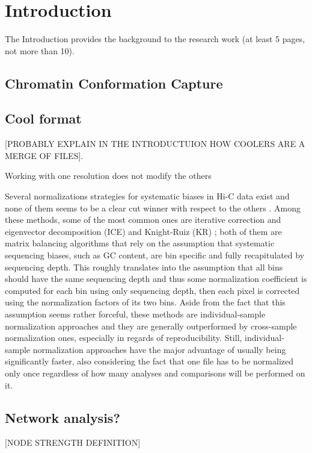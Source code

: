 \graphicspath{{chapters/02_introduction/}}
\chapter{Introduction}

The Introduction provides the background to the research work (at least 5 pages, not more
than 10).

\section{Chromatin Conformation Capture}

\section{Cool format}

[PROBABLY EXPLAIN IN THE INTRODUCTUION HOW COOLERS ARE A MERGE OF FILES]. 

Working with one resolution does not modify the others

Several normalizations strategies for systematic biases in Hi-C data exist and none of them seems to be a clear cut winner with respect to the others \cite{normalization2020}. Among these methods, some of the most common ones are iterative correction and eigenvector decomposition (ICE) \cite{ice2012} and Knight-Ruiz (KR) \cite{knightruiz2012}; both of them are matrix balancing algorithms that rely on the assumption that systematic sequencing biases, such as GC content, are bin specific and fully recapitulated by sequencing depth. This roughly translates into the assumption that all bins should have the same sequencing depth and thus some normalization coefficient is computed for each bin using only sequencing depth, then each pixel is corrected using the normalization factors of its two bins. Aside from the fact that this assumption seems rather forceful, these methods are individual-sample normalization approaches and they are generally outperformed by cross-sample normalization ones, especially in regards of reproducibility. Still, individual-sample normalization approaches have the major advantage of usually being significantly faster, also considering the fact that one file has to be normalized only once regardless of how many analyses and comparisons will be performed on it. 

\section{Network analysis?}

[NODE STRENGTH DEFINITION]